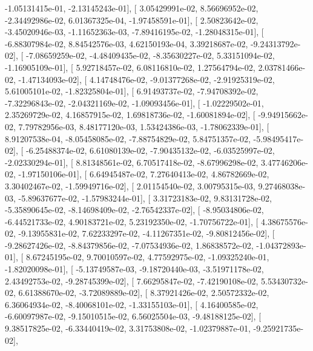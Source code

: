 \documentclass{article}
\begin{document}
         -1.05131415e-01,  -2.13145243e-01],
       [  3.05429991e-02,   8.56696952e-02,  -2.34492986e-02,
          6.01367325e-04,  -1.97458591e-01],
       [  2.50823642e-02,  -3.45020946e-03,  -1.11652363e-03,
         -7.89416195e-02,  -1.28048315e-01],
       [ -6.88307984e-02,   8.84542576e-03,   4.62150193e-04,
          3.39218687e-02,  -9.24313792e-02],
       [ -7.08659259e-02,  -4.48409435e-02,  -8.35630227e-02,
          5.33151094e-02,  -1.16905109e-01],
       [  5.92718457e-02,   6.08116810e-02,   1.27564794e-02,
          2.03781466e-02,  -1.47134093e-02],
       [  4.14748476e-02,  -9.01377268e-02,  -2.91925319e-02,
          5.61005101e-02,  -1.82325804e-01],
       [  6.91493737e-02,  -7.94708392e-02,  -7.32296843e-02,
         -2.04321169e-02,  -1.09093456e-01],
       [ -1.02229502e-01,   2.35269729e-02,   4.16857915e-02,
          1.69818736e-02,  -1.60081894e-02],
       [ -9.94915662e-02,   7.79782956e-03,   8.48177120e-03,
          1.53424386e-03,  -1.78062339e-01],
       [  8.91207538e-04,  -8.05458085e-02,  -7.88754829e-02,
          5.84751357e-02,  -5.98495417e-02],
       [ -6.25488374e-02,   6.61080139e-02,  -7.90435132e-02,
         -6.03525997e-02,  -2.02330294e-01],
       [  8.81348561e-02,   6.70517418e-02,  -8.67996298e-02,
          3.47746206e-02,  -1.97150106e-01],
       [  6.64945487e-02,   7.27640413e-02,   4.86782669e-02,
          3.30402467e-02,  -1.59949716e-02],
       [  2.01154540e-02,   3.00795315e-03,   9.27468038e-03,
         -5.89637677e-02,  -1.57983244e-01],
       [  3.31723183e-02,   9.83131728e-02,  -5.35890645e-02,
         -8.14698409e-02,  -2.76542337e-02],
       [ -8.95034806e-02,  -6.44521733e-02,   4.90183721e-02,
          5.23192350e-02,  -1.70756722e-01],
       [  4.38675576e-02,  -9.13955831e-02,   7.62233297e-02,
         -4.11267351e-02,  -9.80812456e-02],
       [ -9.28627426e-02,  -8.84379856e-02,  -7.07534936e-02,
          1.86838572e-02,  -1.04372893e-01],
       [  8.67245195e-02,   9.70010597e-02,   4.77592975e-02,
         -1.09325240e-01,  -1.82020098e-01],
       [ -5.13749587e-03,  -9.18720440e-03,  -3.51971178e-02,
          2.43492753e-02,  -9.28745399e-02],
       [  7.66295847e-02,  -7.42190108e-02,   5.53430732e-02,
          6.61388670e-02,  -3.72089889e-02],
       [  8.37921426e-02,   2.50572332e-02,   6.36064934e-02,
         -8.40068101e-02,  -1.33155103e-01],
       [  4.16400585e-02,  -6.60097987e-02,  -9.15010515e-02,
          6.56025504e-03,  -9.48188125e-02],
       [  9.38517825e-02,  -6.33440419e-02,   3.31753808e-02,
         -1.02379887e-01,  -9.25921735e-02],
\end{document}

